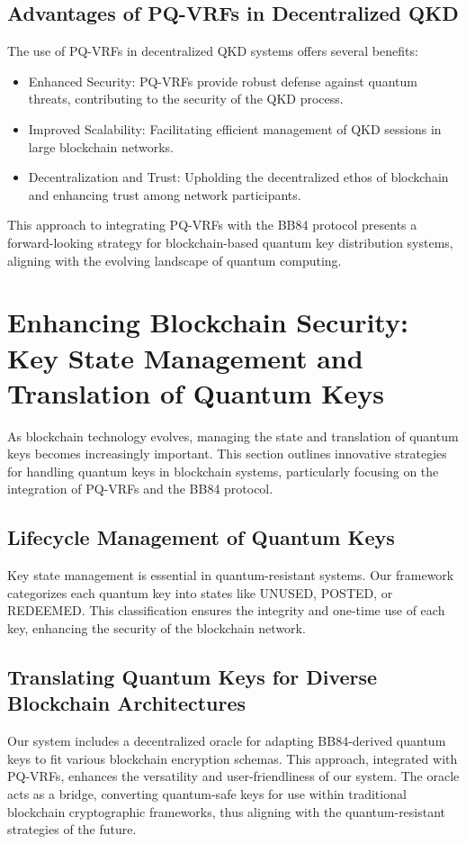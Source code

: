 \documentclass{article}
\begin{document}
\subsection{Advantages of PQ-VRFs in Decentralized QKD}
The use of PQ-VRFs in decentralized QKD systems offers several benefits:
\begin{itemize}
    \item Enhanced Security: PQ-VRFs provide robust defense against quantum threats, contributing to the security of the QKD process.
    \item Improved Scalability: Facilitating efficient management of QKD sessions in large blockchain networks.
    \item Decentralization and Trust: Upholding the decentralized ethos of blockchain and enhancing trust among network participants.
\end{itemize}

This approach to integrating PQ-VRFs with the BB84 protocol presents a forward-looking strategy for blockchain-based quantum key distribution systems, aligning with the evolving landscape of quantum computing.

\section{Enhancing Blockchain Security: Key State Management and Translation of Quantum Keys}
As blockchain technology evolves, managing the state and translation of quantum keys becomes increasingly important. This section outlines innovative strategies for handling quantum keys in blockchain systems, particularly focusing on the integration of PQ-VRFs and the BB84 protocol.

\subsection{Lifecycle Management of Quantum Keys}
Key state management is essential in quantum-resistant systems. Our framework categorizes each quantum key into states like UNUSED, POSTED, or REDEEMED. This classification ensures the integrity and one-time use of each key, enhancing the security of the blockchain network.

\subsection{Translating Quantum Keys for Diverse Blockchain Architectures}
Our system includes a decentralized oracle for adapting BB84-derived quantum keys to fit various blockchain encryption schemas. This approach, integrated with PQ-VRFs, enhances the versatility and user-friendliness of our system. The oracle acts as a bridge, converting quantum-safe keys for use within traditional blockchain cryptographic frameworks, thus aligning with the quantum-resistant strategies of the future.
\end{document}

